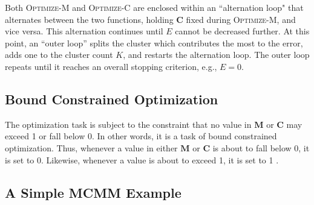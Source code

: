 
Both \textsc{Optimize-M} and \textsc{Optimize-C} are enclosed within 
an ``alternation loop" 
that alternates between the two functions, holding $\mathbf{C}$ fixed
during \textsc{Optimize-M}, and vice versa.
This alternation continues until $E$ cannot be decreased further. At
this point, an ``outer loop''
splits the cluster which contributes the most to the error, adds one
to the cluster count $K$, and restarts the alternation loop. The outer loop
repeats until it reaches an overall stopping criterion, e.g., $E = 0$.
 \subsection{Bound Constrained Optimization}
The optimization task is subject to the constraint %
that no value in $\mathbf{M}$ or $\mathbf{C}$ may exceed 1 or fall below 0. In other words,
it is a task of bound constrained optimization. Thus, whenever a value in either $\mathbf{M}$ or $\mathbf{C}$ is about
to fall below 0, it is set to 0. Likewise, whenever a value is about to exceed 1, it is set to 1
\citep{ni:yuan:1997}.
  

\subsection{A Simple MCMM Example}
\label{subsec:example}


